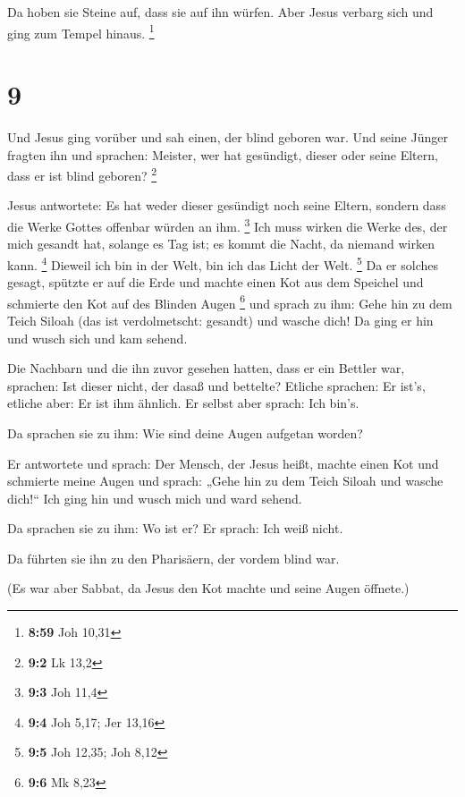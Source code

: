  Da hoben sie Steine auf, dass sie auf ihn würfen. Aber
Jesus verbarg sich und ging zum Tempel hinaus. \footnote{\textbf{8:59}
  Joh 10,31}

\hypertarget{section-4}{%
\section{9}\label{section-4}}

 Und Jesus ging vorüber und sah einen, der blind geboren
war.  Und seine Jünger fragten ihn und sprachen: Meister,
wer hat gesündigt, dieser oder seine Eltern, dass er ist blind geboren?
\footnote{\textbf{9:2} Lk 13,2}

 Jesus antwortete: Es hat weder dieser gesündigt noch
seine Eltern, sondern dass die Werke Gottes offenbar würden an ihm.
\footnote{\textbf{9:3} Joh 11,4}  Ich muss wirken die
Werke des, der mich gesandt hat, solange es Tag ist; es kommt die Nacht,
da niemand wirken kann. \footnote{\textbf{9:4} Joh 5,17; Jer 13,16}
 Dieweil ich bin in der Welt, bin ich das Licht der Welt.
\footnote{\textbf{9:5} Joh 12,35; Joh 8,12}  Da er solches
gesagt, spützte er auf die Erde und machte einen Kot aus dem Speichel
und schmierte den Kot auf des Blinden Augen \footnote{\textbf{9:6} Mk
  8,23}  und sprach zu ihm: Gehe hin zu dem Teich Siloah
(das ist verdolmetscht: gesandt) und wasche dich! Da ging er hin und
wusch sich und kam sehend.

 Die Nachbarn und die ihn zuvor gesehen hatten, dass er
ein Bettler war, sprachen: Ist dieser nicht, der dasaß und bettelte?
 Etliche sprachen: Er ist's, etliche aber: Er ist ihm
ähnlich. Er selbst aber sprach: Ich bin's.

 Da sprachen sie zu ihm: Wie sind deine Augen aufgetan
worden?

 Er antwortete und sprach: Der Mensch, der Jesus heißt,
machte einen Kot und schmierte meine Augen und sprach: „Gehe hin zu dem
Teich Siloah und wasche dich!{}`` Ich ging hin und wusch mich und ward
sehend.

 Da sprachen sie zu ihm: Wo ist er? Er sprach: Ich weiß
nicht.

 Da führten sie ihn zu den Pharisäern, der vordem blind
war.

 (Es war aber Sabbat, da Jesus den Kot machte und seine
Augen öffnete.)

